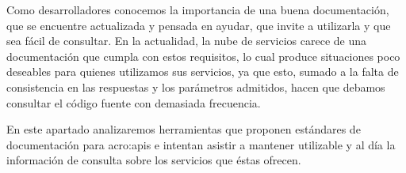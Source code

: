 Como desarrolladores conocemos la importancia de una buena documentación, que se encuentre actualizada y pensada en ayudar, que invite a utilizarla y que sea fácil de consultar. En la actualidad, la nube de servicios carece de una documentación que cumpla con estos requisitos, lo cual produce situaciones poco deseables para quienes utilizamos sus servicios, ya que esto, sumado a la falta de consistencia en las respuestas y los parámetros admitidos, hacen que debamos consultar el código fuente con demasiada frecuencia.

En este apartado analizaremos herramientas que proponen estándares de documentación para \glspl{acro:api} e intentan asistir a mantener utilizable y al día la información de consulta sobre los servicios que éstas ofrecen.
